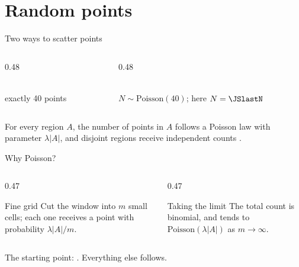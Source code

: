 \documentclass[night,charter,footer]{BeamerJS}
\newcommand{\abs}[1]{\left\lvert #1\right\rvert}
\begin{document}
\section{Random points}

\begin{frame}{Two ways to scatter points}
	\begin{columns}[T,onlytextwidth]
		\begin{column}{0.48\linewidth}
			\centering
			\\[0.3em]
			{\small\sffamily\color{Secondary}exactly 40 points}
		\end{column}
		\begin{column}{0.48\linewidth}
			\centering
			\\[0.3em]
			{\small\sffamily\color{Secondary}%
			 $N\sim\mathrm{Poisson}(40)$; here $N=\JSlastN$}
		\end{column}
	\end{columns}

	\begin{defn}
		For every region $A$, the number of points in $A$ follows a Poisson
		law with parameter $\lambda\abs{A}$, and disjoint regions receive
		independent counts \cite{kingman1993}.
	\end{defn}
\end{frame}

\begin{frame}{Why Poisson?}
	\begin{columns}[T,onlytextwidth]
		\begin{column}{0.47\linewidth}
			\begin{framedbox}{ Fine grid}
				Cut the window into $m$ small cells; each one receives a point
				with probability $\lambda\abs{A}/m$.
			\end{framedbox}
		\end{column}
		\begin{column}{0.47\linewidth}
			\begin{framedbox}{ Taking the limit}
				The total count is binomial, and tends to
				$\mathrm{Poisson}(\lambda\abs{A})$ as $m\to\infty$.
			\end{framedbox}
		\end{column}
	\end{columns}

	\begin{keypoint}
		The starting point: . Everything else
		follows.
	\end{keypoint}
\end{frame}
\end{document}
